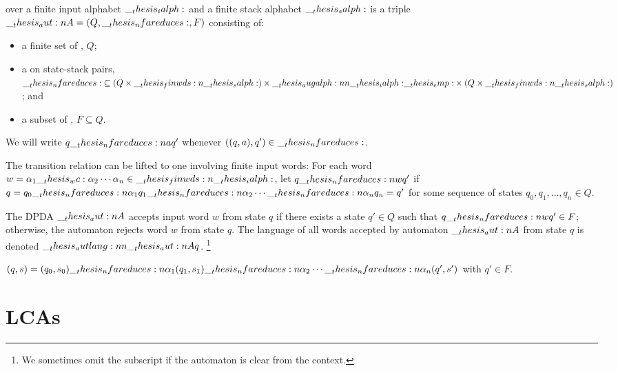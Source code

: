 \begin{definition}
   over a finite input alphabet $\__thesis_ialph:$ and a finite stack alphabet $\__thesis_salph:$ is a triple $\aut{A} = (Q, \mathord{\nfareduces}, F)$ consisting of:
  \begin{itemize}
  \item a finite set of , $Q$;
  \item a  on state-stack pairs, $\mathord{\nfareduces} \subseteq (Q \times \finwds{\salph}) \times \augalph{\ialph}{\emp} \times (Q \times \finwds{\salph})$; and
  \item a subset of , $F \subseteq Q$.
  \end{itemize}

  We will write $q \nfareduces[a] q'$ whenever $((q, a), q') \in \mathord{\nfareduces}$.

  The transition relation can be lifted to one involving finite input words: For each word $w = \alpha_1 \wc \alpha_2 \dotsm \alpha_n \in \finwds{\ialph}$, let $q \nfareduces[w] q'$ if $q = q_0 \nfareduces[\alpha_1] q_1 \nfareduces[\alpha_2] \dotsb \nfareduces[\alpha_n] q_n = q'$ for some sequence of states $q_0, q_1, \dotsc, q_n \in Q$.

  The \ac{DPDA} $\__thesis_aut:n {A}$ accepts input word $w$ from state $q$ if there exists a state $q' \in Q$ such that $q \nfareduces[w] q' \in F$;
  otherwise, the automaton rejects word $w$ from state $q$.
  The language of all words accepted by automaton $\__thesis_aut:n {A}$ from state $q$ is denoted $\__thesis_autlang:nn {\__thesis_aut:n {A}} {q}$.%
  \footnote{We sometimes omit the subscript if the automaton is clear from the context.}

  $(q, s) = (q_0, s_0) \nfareduces[\alpha_1] (q_1, s_1) \nfareduces[\alpha_2] \dotsb \nfareduces[\alpha_n] (q', s')$ with $q' \in F$.
\end{definition}


\section{\Aclp*{LCA}}


